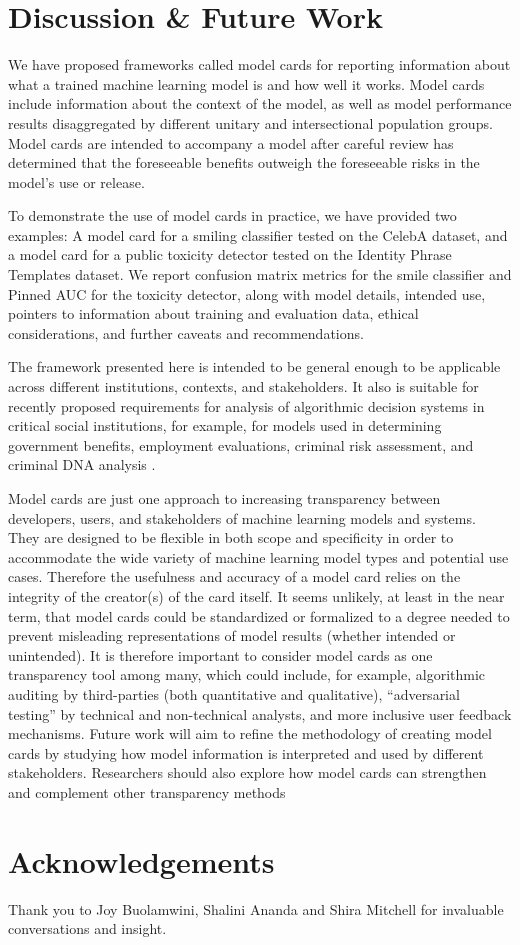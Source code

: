 \documentclass[format=sigconf]{acmart}
\begin{document}




\section{Discussion \& Future Work}

We have proposed frameworks called model cards for reporting information about what a trained machine learning model is and how well it works.  Model cards include information about the context of the model, as well as model performance results disaggregated by different unitary and intersectional population groups.  Model cards are intended to accompany a model after careful review has determined that the foreseeable benefits outweigh the foreseeable risks in the model's use or release.  

To demonstrate the use of model cards in practice, we have provided two examples: A model card for a smiling classifier tested on the CelebA dataset, and a model card for a public toxicity detector tested on the Identity Phrase Templates dataset. We report confusion matrix metrics for the smile classifier and Pinned AUC for the toxicity detector, along with model details, intended use, pointers to information about training and evaluation data, ethical considerations, and further caveats and recommendations. 

The framework presented here is intended to be general enough to be applicable across different institutions, contexts, and stakeholders.  It also is suitable for recently proposed requirements for analysis of algorithmic decision systems in critical social institutions, for example, for models used in determining government benefits, employment evaluations, criminal risk assessment, and criminal DNA analysis \cite{LitigatingAlgorithms2018}.

Model cards are just one approach to increasing transparency between developers, users, and stakeholders of machine learning models and systems. They are designed to be flexible in both scope and specificity in order to accommodate the wide variety of machine learning model types and potential use cases. Therefore the usefulness and accuracy of a model card relies on the integrity of the creator(s) of the card itself. It seems unlikely, at least in the near term, that model cards could be standardized or formalized to a degree needed to prevent misleading representations of model results (whether intended or unintended). It is therefore important to consider model cards as one transparency tool among many, which could include, for example, algorithmic auditing by third-parties (both quantitative and qualitative), ``adversarial testing'' by technical and non-technical analysts, and more inclusive user feedback mechanisms. Future work will aim to refine the methodology of creating model cards by studying how model information is interpreted and used by different stakeholders. Researchers should also explore how model cards can strengthen and complement other transparency methods
\section{Acknowledgements}
Thank you to Joy Buolamwini, Shalini Ananda and Shira Mitchell for invaluable conversations and insight. 







\appendix
\end{document}
